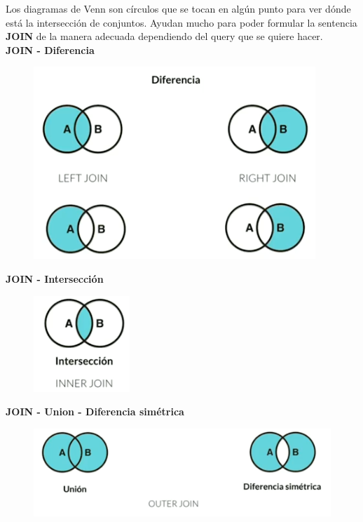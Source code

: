 \documentclass{article}
\begin{document}
Los diagramas de Venn son círculos que se tocan en algún punto para ver dónde
está la intersección de conjuntos. Ayudan mucho para poder formular la
sentencia \textbf{JOIN} de la manera adecuada dependiendo del query que se
quiere hacer.\\

\textbf{JOIN - Diferencia}\\
\begin{figure}[h!]
  \centering
  \includegraphics[scale=0.75]{./Pictures/084_join_diferencia.png}
\end{figure}

\newpage

\textbf{JOIN - Intersección}\\
\begin{figure}[h!]
  \centering
  \includegraphics[scale=0.75]{./Pictures/085_join_interseccion.png}
\end{figure}

\textbf{JOIN - Union - Diferencia simétrica}\\
\begin{figure}[h!]
  \centering
  \includegraphics[scale=0.75]{./Pictures/086_join_outer.png}
\end{figure}
\end{document}
